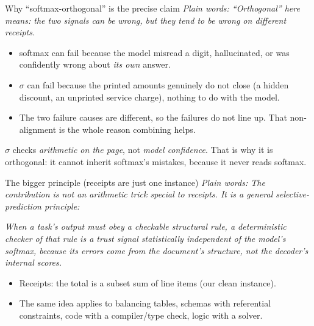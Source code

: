 \documentclass[aspectratio=169]{beamer}
\newcommand{\keybox}[1]{\begin{center}\colorbox{grey!15}{\parbox{0.92\linewidth}{\centering #1}}\end{center}}
\newcommand{\plain}[1]{\textit{\textcolor{sig}{Plain words:} #1}}
\begin{document}
\begin{frame}{Why ``softmax-orthogonal'' is the precise claim}
\plain{``Orthogonal'' here means: the two signals can be wrong, but
they tend to be wrong on \emph{different} receipts.}
\begin{itemize}
\item softmax can fail because the model misread a digit, hallucinated,
or was confidently wrong about \emph{its own} answer.
\item $\sigma$ can fail because the printed amounts genuinely do not
close (a hidden discount, an unprinted service charge), nothing to do
with the model.
\item The two failure causes are different, so the failures do not
line up. That non-alignment is the whole reason combining helps.
\end{itemize}
\keybox{$\sigma$ checks \emph{arithmetic on the page}, not
\emph{model confidence}. That is why it is orthogonal: it cannot
inherit softmax's mistakes, because it never reads softmax.}
\end{frame}

\begin{frame}{The bigger principle (receipts are just one instance)}
\plain{The contribution is not an arithmetic trick special to
receipts. It is a general selective-prediction principle:}
\vspace{0.5em}
\keybox{\emph{When a task's output must obey a checkable structural
rule, a deterministic checker of that rule is a trust signal
statistically independent of the model's softmax, because its errors
come from the document's structure, not the decoder's internal
scores.}}
\vspace{0.5em}
\begin{itemize}
\item Receipts: the total is a subset sum of line items (our clean
instance).
\item The same idea applies to balancing tables, schemas with
referential constraints, code with a compiler/type check, logic with
a solver.
\end{itemize}
\end{frame}
\end{document}
